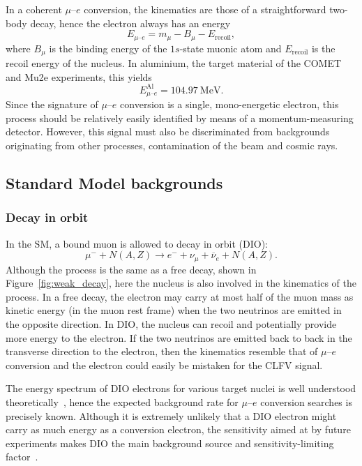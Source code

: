 In a coherent $\mu$--$e$ conversion, the kinematics are those of a
straightforward two-body decay, hence the electron always has an energy
\begin{equation*}\label{eq:mu_e_conv_energy}
E_{\mu\text{--}e} = m_\mu - B_\mu - E_\mathrm{recoil},
\end{equation*}
where $B_\mu$ is the binding energy of the $1s$-state muonic atom and
$E_\mathrm{recoil}$ is the recoil energy of the nucleus. In aluminium, the
target material of the COMET and Mu2e experiments, this yields
$$
    E^\mathrm{Al}_{\mu\text{--}e} = \SI{104.97}{\MeV}.
$$
Since the signature of $\mu$--$e$ conversion is a single, mono-energetic
electron, this process should be relatively easily identified by means of a
momentum-measuring detector. However, this signal must also be discriminated
from backgrounds originating from other processes, contamination of the beam and
cosmic rays.

\subsection{Standard Model backgrounds}\label{sec:sm_backgrounds}
\subsubsection{Decay in orbit}
In the SM, a bound muon is allowed to decay in orbit (DIO):
\begin{equation*}\label{eq:dio}
    \mu^- + N(A, Z) \rightarrow e^- + \nu_\mu + \overline{\nu}_e + N(A, Z).
\end{equation*}
Although the process is the same as a free decay, shown in
Figure~\ref{fig:weak_decay}, here the nucleus is also involved in the kinematics
of the process. In a free decay, the electron may carry at most half of the muon
mass as kinetic energy (in the muon rest frame) when the two neutrinos are
emitted in the opposite direction. In DIO, the nucleus can recoil and
potentially provide more energy to the electron. If the two neutrinos are
emitted back to back in the transverse direction to the electron, then the
kinematics resemble that of $\mu$--$e$ conversion and the electron could easily
be mistaken for the CLFV signal. 


The energy spectrum of DIO electrons for various target nuclei is well
understood theoretically~\cite{czarnecki}, hence the expected background rate
for $\mu$--$e$ conversion searches is precisely known. Although it is extremely
unlikely that a DIO electron might carry as much energy as a conversion
electron, the sensitivity aimed at by future experiments makes DIO the main
background source and sensitivity-limiting
factor~\cite{the_comet_collaboration_comet_2020}.


